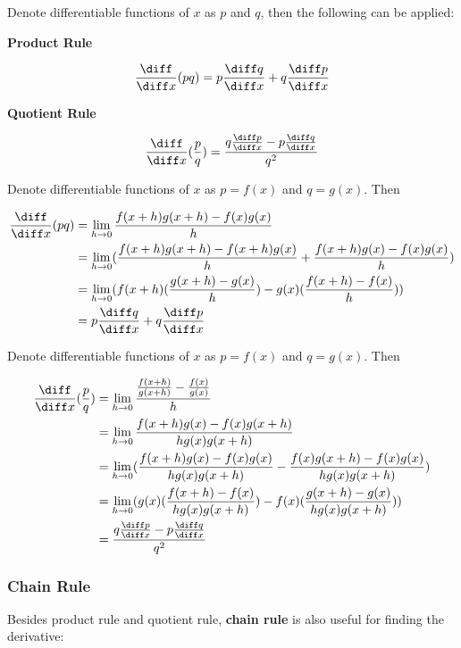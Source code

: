\begin{thm}
  Denote differentiable functions of $x$ as $p$ and $q$, then the following can be applied:

  \begin{alist}
    \item \textbf{Product Rule}

    $$\frac{\diff }{\diff  x}(pq)=p\frac{\diff  q}{\diff  x}+q\frac{\diff  p}{\diff  x}$$

    \item \textbf{Quotient Rule}

    $$\frac{\diff }{\diff  x}(\frac{p}{q})=\frac{q\frac{\diff  p}{\diff  x}-p\frac{\diff  q}{\diff  x}}{q^{2}}$$
  \end{alist}

   Denote differentiable functions of $x$ as $p=f(x)$ and $q=g(x)$. Then

  $$\begin{aligned}[t]
    \frac{\diff }{\diff  x}(pq)&=\lim_{h\to 0}\frac{f(x+h)g(x+h)-f(x)g(x)}{h}\\
    &=\lim_{h\to 0}(\frac{f(x+h)g(x+h)-f(x+h)g(x)}{h}+\frac{f(x+h)g(x)-f(x)g(x)}{h})\\
    &=\lim_{h\to 0}(f(x+h)(\frac{g(x+h)-g(x)}{h})-g(x)(\frac{f(x+h)-f(x)}{h}))\\
    &=p\frac{\diff  q}{\diff  x}+q\frac{\diff  p}{\diff  x}
  \end{aligned}$$\s

   Denote differentiable functions of $x$ as $p=f(x)$ and $q=g(x)$. Then

  $$\begin{aligned}[t]
    \frac{\diff }{\diff  x}(\frac{p}{q})&=\lim_{h\to 0}\frac{\frac{f(x+h)}{g(x+h)}-\frac{f(x)}{g(x)}}{h}\\
    &=\lim_{h\to 0}\frac{f(x+h)g(x)-f(x)g(x+h)}{hg(x)g(x+h)}\\
    &=\lim_{h\to 0}(\frac{f(x+h)g(x)-f(x)g(x)}{hg(x)g(x+h)}-\frac{f(x)g(x+h)-f(x)g(x)}{hg(x)g(x+h)})\\
    &=\lim_{h\to 0}(g(x)(\frac{f(x+h)-f(x)}{hg(x)g(x+h)})-f(x)(\frac{g(x+h)-g(x)}{hg(x)g(x+h)}))\\
    &=\frac{q\frac{\diff  p}{\diff  x}-p\frac{\diff  q}{\diff  x}}{q^{2}}
  \end{aligned}$$
\end{thm}

\subsubsection{Chain Rule}
Besides product rule and quotient rule, \textbf{chain rule} is also useful for finding the derivative:\n

